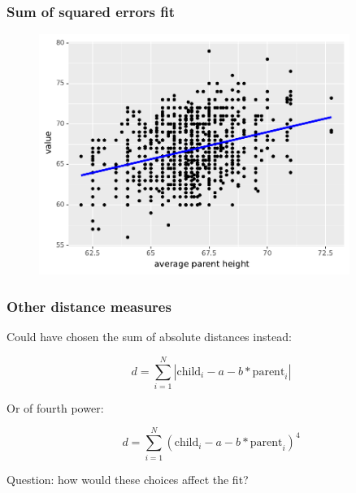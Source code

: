\documentclass[handout]{beamer}
\begin{document}
\begin{frame}
	\frametitle{Sum of squared errors fit}
	
	\begin{figure}[ht]
		\centerline{\includegraphics[width=0.9\textwidth]{../figures/galton_fit_sse.pdf}}
	\end{figure}
	
\end{frame}

\begin{frame}
	\frametitle{Other distance measures}
	
	Could have chosen the sum of absolute distances instead:
	
	\begin{equation}
	d = \sum_{i=1}^{N} |\text{child}_i - a - b * \text{parent}_i|
	\end{equation}
	
	Or of fourth power:
	
	\begin{equation}
	d = \sum_{i=1}^{N} (\text{child}_i - a - b * \text{parent}_i)^4
	\end{equation}
		
	Question: how would these choices affect the fit?
	
\end{frame}
\end{document}
